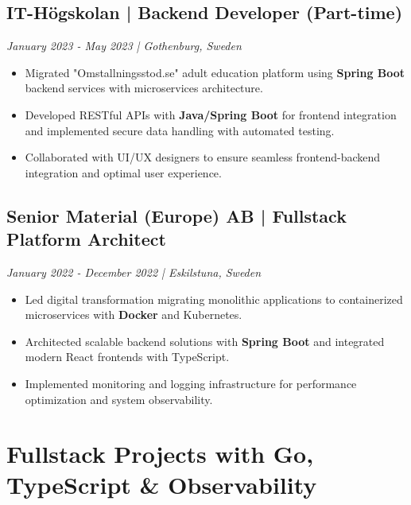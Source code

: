 \documentclass[10pt,a4paper]{article}
\begin{document}
\subsection*{IT-Högskolan | Backend Developer (Part-time)}
\textit{January 2023 - May 2023 | Gothenburg, Sweden}
\begin{itemize}[noitemsep]
\item Migrated "Omstallningsstod.se" adult education platform using \textbf{Spring Boot} backend services with microservices architecture.
\item Developed RESTful APIs with \textbf{Java/Spring Boot} for frontend integration and implemented secure data handling with automated testing.
\item Collaborated with UI/UX designers to ensure seamless frontend-backend integration and optimal user experience.
\end{itemize}

\subsection*{Senior Material (Europe) AB | Fullstack Platform Architect}
\textit{January 2022 - December 2022 | Eskilstuna, Sweden}
\begin{itemize}[noitemsep]
\item Led digital transformation migrating monolithic applications to containerized microservices with \textbf{Docker} and Kubernetes.
\item Architected scalable backend solutions with \textbf{Spring Boot} and integrated modern React frontends with TypeScript.
\item Implemented monitoring and logging infrastructure for performance optimization and system observability.
\end{itemize}

\section*{Fullstack Projects with Go, TypeScript \& Observability}
\end{document}
